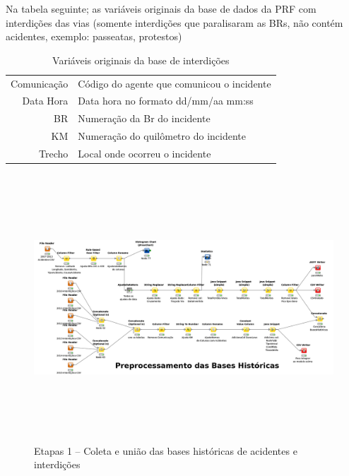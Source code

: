 \pagebreak

Na tabela seguinte; as variáveis originais da base de dados da PRF com interdições das vias 
(somente interdições que paralisaram as BRs, não contém acidentes, exemplo: passeatas, protestos) 

\begin{table}[htbp]
 \centering
  \caption{Variáveis originais da base de interdições}
  
  \begin{tabular}{r|l} \hline
   Comunicação & Código do agente que comunicou o incidente \\
   Data Hora & Data hora no formato dd/mm/aa mm:ss \\
   BR & Numeração da Br do incidente\\
   KM & Numeração do quilômetro do incidente\\
   Trecho  & Local onde ocorreu o incidente \\
  \end{tabular}
\end{table}


\begin{figure}[ht]
  \centering
    \caption{Etapas 1 -- Coleta e união das bases históricas de acidentes e interdições}
    \includegraphics[width=165mm, height=100mm]{Figuras/Cronograma/BasesHistoricas.png}
\end{figure}